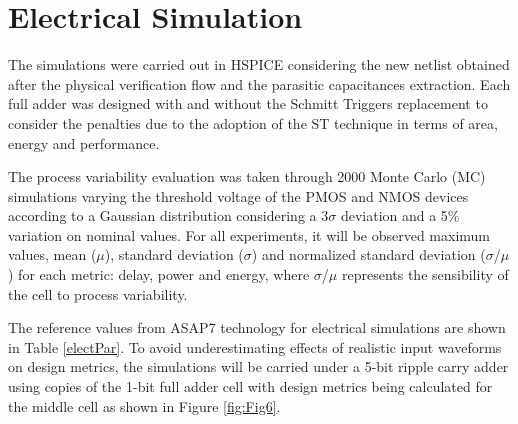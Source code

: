\documentclass[ecp,tc, english]{iiufrgs}
\begin{document}
\section{Electrical Simulation}

The simulations were carried out in HSPICE considering the new netlist obtained after the physical verification flow and the parasitic capacitances extraction. Each full adder was designed with and without the Schmitt Triggers replacement to consider the penalties due to the adoption of the ST technique in terms of area, energy and performance.

The process variability evaluation was taken
through 2000 Monte Carlo (MC) simulations varying
the threshold voltage of the PMOS and NMOS devices
according to a Gaussian distribution considering a 3\(\sigma\) deviation and a 5\% variation on nominal values. For all experiments, it will be observed maximum values, mean (\(\mu\)), standard deviation (\(\sigma\)) and normalized standard deviation (\(\sigma\)/\(\mu\)) for each metric: delay, power and energy, where \(\sigma\)/\(\mu\) represents the sensibility of the cell to process variability. 

The reference values from ASAP7 technology for electrical simulations are shown in Table \ref{electPar}. To avoid underestimating effects of realistic input waveforms on design metrics, the simulations will be carried under a 5-bit ripple carry adder using copies of the 1-bit full adder cell with design metrics being calculated for the middle cell as shown in Figure \ref{fig:Fig6}. 
\end{document}
